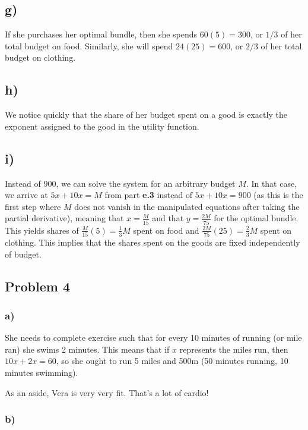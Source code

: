 \documentclass[12pt,letterpaper]{article}
\theoremstyle{definition}
\begin{document}
\subsection*{g)}

If she purchases her optimal bundle, then she spends $60(5) = 300$, or $1/3$ of her total budget on food. Similarly, she will spend $24(25) = 600$, or $2/3$ of her total budget on clothing.

\subsection*{h)} 

We notice quickly that the share of her budget spent on a good is exactly the exponent assigned to the good in the utility function.

\subsection*{i)}

Instead of $900$, we can solve the system for an arbitrary budget $M$. In that case, we arrive at $5x + 10x = M$ from part \textbf{e.3} instead of $5x + 10x = 900$ (as this is the first step where $M$ does not vanish in the manipulated equations after taking the partial derivative), meaning that $x = \frac{M}{15}$ and that $y = \frac{2M}{75}$ for the optimal bundle. This yields shares of $\frac{M}{15}(5) = \frac{1}{3}M$ spent on food and $\frac{2M}{75}(25) = \frac{2}{3}M$ spent on clothing. This implies that the shares spent on the goods are fixed independently of budget.

\subsection*{Problem 4}

\subsubsection*{a)}
She needs to complete exercise such that for every 10 minutes of running (or mile ran) she swims 2 minutes. This means that if $x$ represents the miles run, then $10x + 2x = 60$, so she ought to run 5 miles and 500m (50 minutes running, 10 minutes swimming).

As an aside, Vera is very very fit. That's a lot of cardio!

\subsubsection*{b)}
\end{document}
